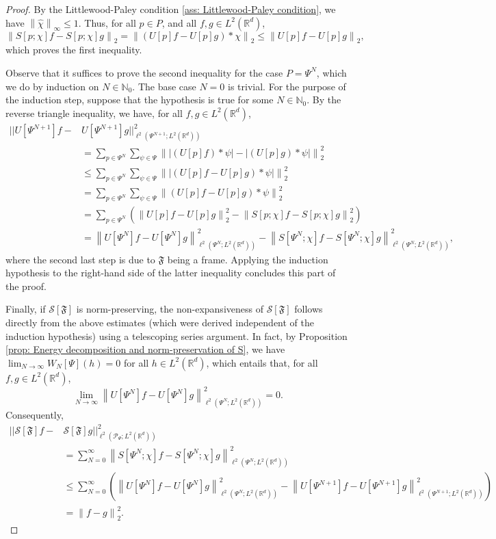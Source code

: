 \documentclass[11pt]{amsart}
\newcommand{\R}{{\mathbb{R}}}
\newcommand{\N}{\mathbb{N}}
\newcommand{\s}{\mathcal{S}}
\newcommand{\norm}[1]{\ensuremath{\left\lVert\text{}#1\text{}\right\rVert}}
\newenvironment{proof sketch} {\textit{Proof sketch.}}{}
\begin{document}
  \begin{proof}
    By the Littlewood-Paley condition \eqref{ass: Littlewood-Paley condition}, we have $\norm{\widehat{\chi}}_\infty \leq 1$. Thus, for all $p \in P$, and all $f,g \in L^2(\R^d)$, 
    \[\norm{S[p;\chi]f-S[p;\chi]g}_2=\norm{(U[p]f-U[p]g)*\chi}_2 \leq \norm{U[p]f-U[p]g}_2,\]
    which proves the first inequality. 
    
    Observe that it suffices to prove the second inequality for the case $P=\Psi^N$, which we do by induction on $N\in \N_0$. The base case $N=0$ is trivial. For the purpose of the induction step, suppose that the hypothesis is true for some $N \in \N_0$. 
    By the reverse triangle inequality, we have, for all $f,g \in L^2(\R^d)$,
    \begin{align*}
      \lvert|U[\Psi^{N+1}]f-&U[\Psi^{N+1}]g\rvert|_{\ell^2(\Psi^{N+1};L^2(\R^d))}^2 \\
      &= \sum_{p \in \Psi^N}\sum_{\psi \in \Psi} \norm{|(U[p]f)*\psi|-|(U[p]g)*\psi|}_2^2 \\
      &\leq \sum_{p \in \Psi^N}\sum_{\psi \in \Psi} \norm{|(U[p]f-U[p]g)*\psi|}_2^2\\
      &=\sum_{p \in \Psi^N}\sum_{\psi \in \Psi} \norm{(U[p]f-U[p]g)*\psi}_2^2 \\
      &= \sum_{p \in \Psi^N} (\norm{U[p]f-U[p]g}_2^2-\norm{S[p;\chi]f-S[p;\chi]g}_2^2) \\
      &= \norm{U[\Psi^{N}]f-U[\Psi^{N}]g}_{\ell^2(\Psi^{N};L^2(\R^d))}^2-\norm{S[\Psi^{N};\chi]f-S[\Psi^{N};\chi]g}_{\ell^2(\Psi^{N};L^2(\R^d))}^2,
    \end{align*}
    where the second last step is due to $\mathfrak{F}$ being a frame. Applying the induction hypothesis to the right-hand side of the latter inequality concludes this part of the proof. 
  
    Finally, if $\s[\mathfrak{F}]$ is norm-preserving, the non-expansiveness of $\s[\mathfrak{F}]$ follows directly from the above estimates (which were derived independent of the induction hypothesis) using a telescoping series argument. In fact, by Proposition \ref{prop: Energy decomposition and norm-preservation of S}, we have $\lim_{N \to \infty} W_N[\Psi](h)=0$ for all $h \in L^2(\R^d)$, which entails that, for all $f,g \in L^2(\R^d)$,
    \[\lim_{N \to \infty} \norm{U[\Psi^{N}]f-U[\Psi^{N}]g}_{\ell^2(\Psi^{N};L^2(\R^d))}^2=0.\]
    Consequently,
    \begin{align*}
      \lvert|\s[\mathfrak{F}]f-&\s[\mathfrak{F}]g\rvert|_{\ell^2(\mathcal{P}_\Psi;L^2(\R^d))}^2 \\
      &= \sum_{N=0}^\infty \norm{S[\Psi^{N};\chi]f-S[\Psi^{N};\chi]g}_{\ell^2(\Psi^{N};L^2(\R^d))}^2 \\
      &\leq \sum_{N=0}^\infty \left(\norm{U[\Psi^{N}]f-U[\Psi^{N}]g}_{\ell^2(\Psi^{N};L^2(\R^d))}^2-\norm{U[\Psi^{N+1}]f-U[\Psi^{N+1}]g}_{\ell^2(\Psi^{N+1};L^2(\R^d))}^2\right)\\
      &= \norm{f-g}_2^2.
    \end{align*}
  \end{proof}
  
\end{document}
